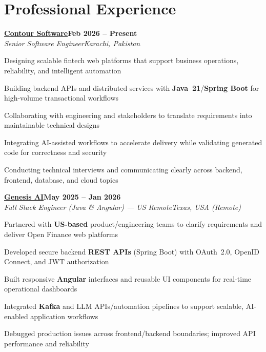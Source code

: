 \documentclass[letterpaper,10pt]{article}
\newcommand{\heading}[2]{
  \hspace{8pt}#1\hfill#2\\
}
\newcommand{\headingBf}[2]{
  \heading{\textbf{#1}}{\textbf{#2}}
}
\newcommand{\headingIt}[2]{
  \heading{\textit{#1}}{\textit{#2}}
}
\newenvironment{resume_list}{
  \vspace{-6pt}
  \begin{itemize}[itemsep=-1px, parsep=0.5pt, topsep=1pt, leftmargin=22pt]
}{
  \end{itemize}
  \vspace{-2pt}
}
\begin{document}
\section{Professional Experience}

\headingBf{\href{https://contour-software.com/}{Contour Software}}{Feb 2026 -- Present}
\headingIt{Senior Software Engineer}{Karachi, Pakistan}
\begin{resume_list}
  \item Designing scalable fintech web platforms that support business operations, reliability, and intelligent automation
  \item Building backend APIs and distributed services with \textbf{Java~21}/\textbf{Spring Boot} for high-volume transactional workflows
  \item Collaborating with engineering and stakeholders to translate requirements into maintainable technical designs
  \item Integrating AI-assisted workflows to accelerate delivery while validating generated code for correctness and security
  \item Conducting technical interviews and communicating clearly across backend, frontend, database, and cloud topics
\end{resume_list}

\vspace{2pt}
\headingBf{\href{https://www.linkedin.com/company/genesisaico/}{Genesis AI}}{May 2025 -- Jan 2026}
\headingIt{Full Stack Engineer (Java \& Angular) --- US Remote}{Texas, USA (Remote)}
\begin{resume_list}
  \item Partnered with \textbf{US-based} product/engineering teams to clarify requirements and deliver Open Finance web platforms
  \item Developed secure backend \textbf{REST APIs} (Spring Boot) with OAuth~2.0, OpenID Connect, and JWT authorization
  \item Built responsive \textbf{Angular} interfaces and reusable UI components for real-time operational dashboards
  \item Integrated \textbf{Kafka} and LLM APIs/automation pipelines to support scalable, AI-enabled application workflows
  \item Debugged production issues across frontend/backend boundaries; improved API performance and reliability
\end{resume_list}
\end{document}
